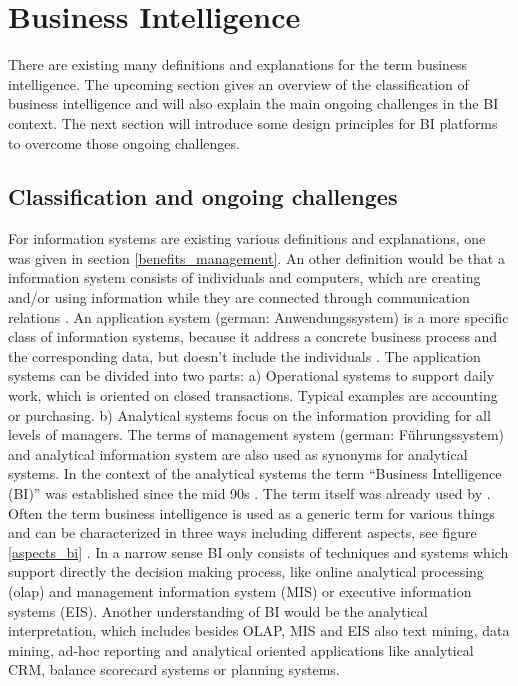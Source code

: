 \section{Business Intelligence}
\label{business_intelligence}

There are existing many definitions and explanations for the term business intelligence. The upcoming section gives an overview of the classification of business intelligence and will also explain the main ongoing challenges in the BI context. The next section will introduce some design principles for BI platforms to overcome those ongoing challenges.

\subsection{Classification and ongoing challenges}
\label{classification_challenges}

For information systems are existing various definitions and explanations, one was given in section \ref{benefits_management}. 
An other definition would be that a information system consists of individuals and computers, which are creating and/or using information while they are connected through communication relations \citep[translated from][p.131]{hansen_wirtschaftsinformatik_2009}.  An application system (german: Anwendungssystem) is a more specific class of information systems, because it address a concrete business process and the corresponding data, but doesn't include the individuals \citep[translated from][p.326]{stahlknechthasenkamp2005}.
\newline\newline
The application systems can be divided into two parts: a) Operational systems to support daily work, which is oriented on closed transactions. Typical examples are accounting or purchasing. b) Analytical systems focus on the information providing for all levels of managers. The terms of management system (german: Führungssystem) \citep[p.331]{stahlknechthasenkamp2005} and analytical information system \citep{chamonigluchowski2006} are also used as synonyms for analytical systems.
\newline\newline
In the context of the analytical systems the term ``Business Intelligence (BI)'' was established since the mid 90s \citep[p.1]{kempermehannaunger2006}. The term itself was already used by \citet{luhn1958}. Often the term business intelligence is used as a generic term for various things \citep[cf.][p.5]{gluchowski2001} and can be characterized in three ways including different aspects, see figure \ref{aspects_bi} \citep[p.7f.]{kempermehannaunger2006}. In a narrow sense BI only consists of techniques and systems which support directly the decision making process, like online analytical processing (olap) and management information system (MIS) or executive information systems (EIS). Another understanding of BI would be the analytical interpretation, which includes besides OLAP, MIS and EIS also text mining, data mining, ad-hoc reporting and analytical oriented applications like analytical CRM, balance scorecard systems or planning systems.

